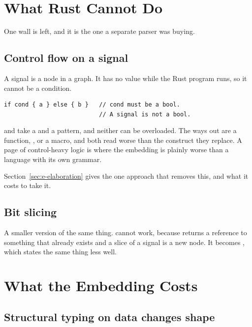 \section{What Rust Cannot Do}
\label{sec:e-walls}

One wall is left, and it is the one a separate parser was buying.

\subsection{Control flow on a signal}

A signal is a node in a graph. It has no value while the Rust program runs,
so it cannot be a condition.

\begin{lstlisting}[caption={The wall. A signal has no value while the program runs, so it cannot be a condition.},label={lst:wall}]
if cond { a } else { b }   // cond must be a bool.
                           // A signal is not a bool.
\end{lstlisting}

 and  take a  and a pattern, and neither
can be overloaded. The ways out are a function, , or
a macro, and both read worse than the construct they replace. A page of
control-heavy logic is where the embedding is plainly worse than a language
with its own grammar.

Section~\ref{sec:e-elaboration} gives the one approach that removes this,
and what it costs to take it.

\subsection{Bit slicing}

A smaller version of the same thing.  cannot work, because
 returns a reference to something that already exists and a
slice of a signal is a new node. It becomes , which
states the same thing less well.

\section{What the Embedding Costs}
\label{sec:e-costs}

\subsection{Structural typing on data changes shape}

